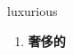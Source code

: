 
\begin{frame}
{\huge luxurious}
\begin{center}
\begin{enumerate}\Large
  \item \textbf{奢侈的}
\end{enumerate}
\end{center}
\end{frame}
